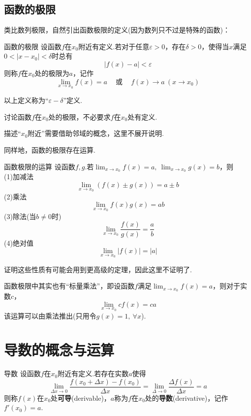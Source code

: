 \documentclass[lang=cn, zihao=5]{elegantbook}
\newcommand{\cor}{~\textit{或}~}
\begin{document}
\subsection{函数的极限}

类比数列极限，自然引出函数极限的定义(因为数列只不过是特殊的函数)：

\begin{definition}{函数的极限}
	设函数$f$在$x_0$附近有定义.若对于任意$\varepsilon > 0$，存在$\delta > 0$，使得当$x$满足$0<|x-x_0|<\delta$时总有$$|f(x)-a|<\varepsilon$$
	则称$f$在$x_0$处的极限为$a$，记作$$\lim_{x \to x_0}{f(x)=a} \quad \cor \quad f(x) \to a~(x \to x_0)$$
\end{definition}
\begin{remark}
	以上定义称为“$\varepsilon - \delta$”定义.
\end{remark}
\begin{remark}
	讨论函数$f$在$x_0$处的极限，不必要求$f$在$x_0$处有定义.
\end{remark}
\begin{remark}
	描述“$x_0$附近”需要借助邻域的概念，这里不展开说明.
\end{remark}

同样地，函数的极限存在运算.

\begin{theorem}{函数极限的运算} %
	设函数$f,g$.若$\lim_{x \to x_0} f(x)=a,~\lim_{x \to x_0} g(x)=b$，则 \\
	(1)加减法$$\lim_{x \to x_0}{(f(x) \pm g(x))} = a \pm b$$
	(2)乘法$$\lim_{x \to x_0}{f(x)g(x)} = ab$$
	(3)除法(当$b \neq 0$时)$$\lim_{x \to x_0}{\frac{f(x)}{g(x)}} = \frac{a}{b}$$
	(4)绝对值$$\lim_{x \to x_0}{|f(x)|} = |a|$$
\end{theorem}
\begin{remark}
	证明这些性质有可能会用到更高级的定理，因此这里不证明了.
\end{remark}
\begin{remark}
	函数极限中其实也有“标量乘法”，即设函数$f$满足$\lim_{x \to x_0}f(x)=a$，则对于实数$c$，$$\lim_{x \to x_0}{cf(x)}=ca$$
	该运算可以由乘法推出(只用令$g(x)=1,~\forall x$).
\end{remark}

\section{导数的概念与运算}

\begin{definition}{导数}
	设函数$f$在$x_0$附近有定义.若存在实数$a$使得$$\lim_{\Delta x \to 0} {\frac{f(x_0+\Delta x)-f(x_0)}{\Delta x}} = \lim_{\Delta \to 0}{\frac{\Delta f(x)}{\Delta x}} = a$$
	则称$f(x)$在$x_0$处\textbf{可导}(derivable)，$a$称为$f$在$x_0$处的\textbf{导数}(derivative)，记作$f'(x_0)=a$.
\end{definition}
\end{document}

